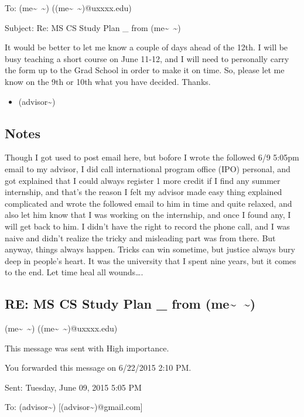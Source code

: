 \documentclass[9pt,b5paper]{article}
\begin{document}
To: (me\textasciitilde{}~\textasciitilde{}) ((me\textasciitilde{}~\textasciitilde{})@uxxxx.edu)

Subject: Re: MS CS Study Plan \_ from (me\textasciitilde{}~\textasciitilde{})

It would be better to let me know a couple of days ahead of the 12th. I will be busy teaching a short course on June 11-12, and I will need to personally carry the form up to the Grad School in order to make it on time. So, please let me know on the 9th or 10th what you have decided. Thanks.

\begin{itemize}
\item (advisor\textasciitilde{})
\end{itemize}

\subsection{Notes}
\label{sec-7-4}
Though I got used to post email here, but bofore I wrote the followed 6/9 5:05pm email to my advisor, I did call international program office (IPO) personal, and got explained that I could always register 1 more credit if I find any summer internship, and that's the reason I felt my advisor made easy thing explained complicated and wrote the followed email to him in time and quite relaxed, and also let him know that I was working on the internship, and once I found any, I will get back to him. I didn't have the right to record the phone call, and I was naive and didn't realize the tricky and misleading part was from there. But anyway, things always happen. Tricks can win sometime, but justice always bury deep in people's heart. It was the university that I spent nine years, but it comes to the end. Let time heal all wounds\ldots{}.

\subsection{RE: MS CS Study Plan \_ from (me\textasciitilde{}~\textasciitilde{})}
\label{sec-7-5}
(me\textasciitilde{}~\textasciitilde{}) ((me\textasciitilde{}~\textasciitilde{})@uxxxx.edu)

This message was sent with High importance.

You forwarded this message on 6/22/2015 2:10 PM.

Sent:        Tuesday, June 09, 2015 5:05 PM

To:        
(advisor\textasciitilde{}) [(advisor\textasciitilde{})@gmail.com]
\end{document}
